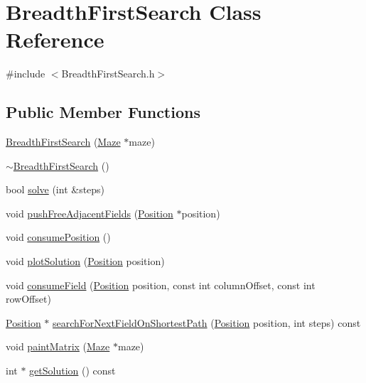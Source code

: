 \hypertarget{class_breadth_first_search}{\section{Breadth\-First\-Search Class Reference}
\label{class_breadth_first_search}
}


{\ttfamily \#include $<$Breadth\-First\-Search.\-h$>$}

\subsection*{Public Member Functions}
\begin{DoxyCompactItemize}
\item 
\hyperlink{class_breadth_first_search_aa2eb988878d47abbb9a75de86dd3ccb6}{Breadth\-First\-Search} (\hyperlink{class_maze}{Maze} $\ast$maze)
\item 
\hyperlink{class_breadth_first_search_af56e60466779aa47b1b3c10a1a84d8ca}{$\sim$\-Breadth\-First\-Search} ()
\item 
bool \hyperlink{class_breadth_first_search_a0fccce0a839583c2e80eaacc1be8ed2e}{solve} (int \&steps)
\item 
void \hyperlink{class_breadth_first_search_a466d9907ad4223398e65c56743c887fe}{push\-Free\-Adjacent\-Fields} (\hyperlink{class_position}{Position} $\ast$position)
\item 
void \hyperlink{class_breadth_first_search_a71c86843e6fd1927280edbbb8fef9c23}{consume\-Position} ()
\item 
void \hyperlink{class_breadth_first_search_aff710f432b18251df00018f9a1603f19}{plot\-Solution} (\hyperlink{class_position}{Position} position)
\item 
void \hyperlink{class_breadth_first_search_a83527ad23d6f10bea0a91fe0aad1056d}{consume\-Field} (\hyperlink{class_position}{Position} position, const int column\-Offset, const int row\-Offset)
\item 
\hyperlink{class_position}{Position} $\ast$ \hyperlink{class_breadth_first_search_a31746f6d04a82b21a8c81a320fa61023}{search\-For\-Next\-Field\-On\-Shortest\-Path} (\hyperlink{class_position}{Position} position, int steps) const 
\item 
void \hyperlink{class_breadth_first_search_a05f93f3345839fd43f4b1b4f7692b675}{paint\-Matrix} (\hyperlink{class_maze}{Maze} $\ast$maze)
\item 
int $\ast$ \hyperlink{class_breadth_first_search_a5e5e17159bdda443af254af3f793b80f}{get\-Solution} () const 

\end{DoxyCompactItemize}
